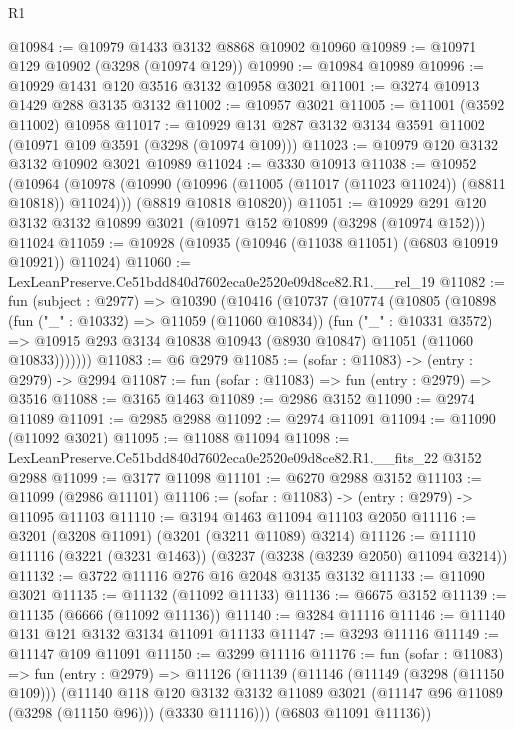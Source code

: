 \begin{lexlean}{R1}
\begin{coremodule}
@10984 := @10979 @1433 @3132 @8868 @10902 @10960
@10989 := @10971 @129 @10902 (@3298 (@10974 @129))
@10990 := @10984 @10989
@10996 := @10929 @1431 @120 @3516 @3132 @10958 @3021
@11001 := @3274 @10913 @1429 @288 @3135 @3132
@11002 := @10957 @3021
@11005 := @11001 (@3592 @11002) @10958
@11017 := @10929 @131 @287 @3132 @3134 @3591 @11002 (@10971 @109 @3591 (@3298 (@10974 @109)))
@11023 := @10979 @120 @3132 @3132 @10902 @3021 @10989
@11024 := @3330 @10913
@11038 := @10952
    (@10964
      (@10978 (@10990 (@10996 (@11005 (@11017 (@11023 @11024)) (@8811 @10818)) @11024)))
      (@8819 @10818 @10820))
@11051 := @10929
    @291
    @120
    @3132
    @3132
    @10899
    @3021
    (@10971 @152 @10899 (@3298 (@10974 @152)))
    @11024
@11059 := @10928 (@10935 (@10946 (@11038 @11051) (@6803 @10919 @10921)) @11024)
@11060 := LexLeanPreserve.Ce51bdd840d7602eca0e2520e09d8ce82.R1.__rel_19
@11082 := fun (subject : @2977) =>
  @10390
    (@10416
      (@10737
        (@10774
          (@10805
            (@10898
              (fun ("_" : @10332) => @11059 (@11060 @10834))
              (fun ("_" : @10331 @3572) =>
              @10915 @293 @3134 @10838 @10943 (@8930 @10847) @11051 (@11060 @10833)))))))
@11083 := @6 @2979
@11085 := (sofar : @11083) -> (entry : @2979) -> @2994
@11087 := fun (sofar : @11083) => fun (entry : @2979) => @3516
@11088 := @3165 @1463
@11089 := @2986 @3152
@11090 := @2974 @11089
@11091 := @2985 @2988
@11092 := @2974 @11091
@11094 := @11090 (@11092 @3021)
@11095 := @11088 @11094
@11098 := LexLeanPreserve.Ce51bdd840d7602eca0e2520e09d8ce82.R1.__fits_22 @3152 @2988
@11099 := @3177 @11098
@11101 := @6270 @2988 @3152
@11103 := @11099 (@2986 @11101)
@11106 := (sofar : @11083) -> (entry : @2979) -> @11095 @11103
@11110 := @3194 @1463 @11094 @11103 @2050
@11116 := @3201 (@3208 @11091) (@3201 (@3211 @11089) @3214)
@11126 := @11110 @11116 (@3221 (@3231 @1463)) (@3237 (@3238 (@3239 @2050) @11094 @3214))
@11132 := @3722 @11116 @276 @16 @2048 @3135 @3132
@11133 := @11090 @3021
@11135 := @11132 (@11092 @11133)
@11136 := @6675 @3152
@11139 := @11135 (@6666 (@11092 @11136))
@11140 := @3284 @11116
@11146 := @11140 @131 @121 @3132 @3134 @11091 @11133
@11147 := @3293 @11116
@11149 := @11147 @109 @11091
@11150 := @3299 @11116
@11176 := fun (sofar : @11083) =>
  fun (entry : @2979) =>
  @11126
    (@11139
      (@11146
        (@11149 (@3298 (@11150 @109)))
        (@11140
          @118
          @120
          @3132
          @3132
          @11089
          @3021
          (@11147 @96 @11089 (@3298 (@11150 @96)))
          (@3330 @11116)))
      (@6803 @11091 @11136))

\end{coremodule}
\end{lexlean}
